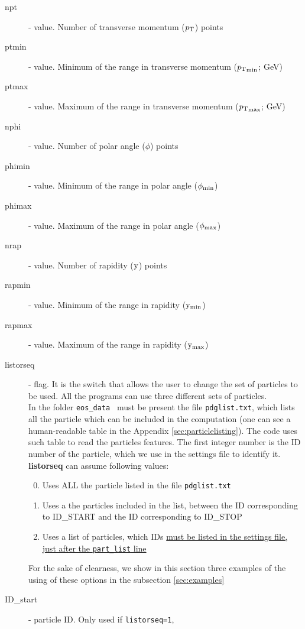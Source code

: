 \begin{description}
 \item[npt] \integer - value. Number of transverse momentum ($p_\mathrm{T}$) points
\item[ptmin] \real - value. Minimum of the range in transverse momentum (${p_\mathrm{T}}_{\rm min}$; GeV) 
\item[ptmax] \real - value. Maximum of the range in transverse momentum (${p_\mathrm{T}}_{\rm max}$; GeV) 
\item[nphi]  \integer - value. Number of polar angle ($\phi$)  points
\item[phimin] \real - value. Minimum of the range in polar angle  ($\phi_{\rm min}$)
\item[phimax] \real - value. Maximum of the range in polar angle  ($\phi_{\rm max}$)
\item[nrap] \integer - value. Number of rapidity ($\mathrm{y}$) points 
\item[rapmin] \real - value. Minimum of the range in rapidity ($\mathrm{y}_{\rm min}$)
\item[rapmax] \real - value. Maximum of the range in rapidity ($\mathrm{y}_{\rm max}$)
\item[listorseq] \integer - flag. It is the switch that allows the user to 
 change the set of particles to be used. 
 All the programs can use three different sets of particles. \\
In the folder {\tt eos\_data } must be present the file {\tt pdglist.txt}, which lists all the 
particle which can be included in the computation (one can see a human-readable 
table in the Appendix \ref{sec:particlelisting}). The code uses such table to 
read the particles features. The first integer number is the ID number of the 
particle, which we use in the settings file to identify it. 
 \textbf{listorseq}   can assume following values:
 \begin{enumerate} \setcounter{enumi}{-1}
  \item Uses ALL the particle listed in the file {\tt pdglist.txt}
  \item Uses a the particles included in the list, between the ID corresponding
  to ID\_START and the ID corresponding to ID\_STOP 
  \item Uses a list of particles, which IDs \ul{must be listed in the 
  settings file, just after the {\tt part\_list} line}
 \end{enumerate}
 For the sake of clearness, we show in this section three examples of the using 
 of these options in the subsection \ref{sec:examples}
 \item[ID\_start] \integer - particle ID. Only used if {\tt listorseq=1}, 

\end{description}
